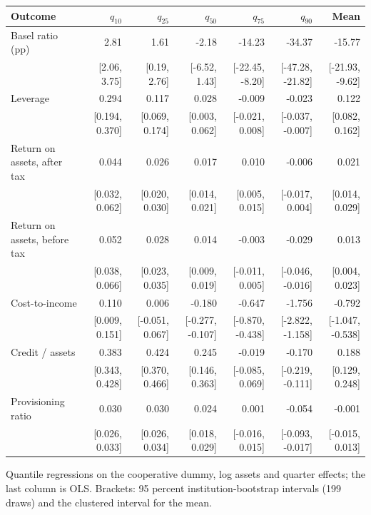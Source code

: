 \footnotesize
\setlength{\tabcolsep}{2.5pt}
\begin{tabular}{lrrrrrr}
\toprule
Outcome & $q_{10}$ & $q_{25}$ & $q_{50}$ & $q_{75}$ & $q_{90}$ & Mean \\
\midrule
Basel ratio (pp) & 2.81 & 1.61 & -2.18 & -14.23 & -34.37 & -15.77 \\
 & [2.06, 3.75] & [0.19, 2.76] & [-6.52, 1.43] & [-22.45, -8.20] & [-47.28, -21.82] & [-21.93, -9.62] \\
Leverage & 0.294 & 0.117 & 0.028 & -0.009 & -0.023 & 0.122 \\
 & [0.194, 0.370] & [0.069, 0.174] & [0.003, 0.062] & [-0.021, 0.008] & [-0.037, -0.007] & [0.082, 0.162] \\
Return on assets, after tax & 0.044 & 0.026 & 0.017 & 0.010 & -0.006 & 0.021 \\
 & [0.032, 0.062] & [0.020, 0.030] & [0.014, 0.021] & [0.005, 0.015] & [-0.017, 0.004] & [0.014, 0.029] \\
Return on assets, before tax & 0.052 & 0.028 & 0.014 & -0.003 & -0.029 & 0.013 \\
 & [0.038, 0.066] & [0.023, 0.035] & [0.009, 0.019] & [-0.011, 0.005] & [-0.046, -0.016] & [0.004, 0.023] \\
Cost-to-income & 0.110 & 0.006 & -0.180 & -0.647 & -1.756 & -0.792 \\
 & [0.009, 0.151] & [-0.051, 0.067] & [-0.277, -0.107] & [-0.870, -0.438] & [-2.822, -1.158] & [-1.047, -0.538] \\
Credit / assets & 0.383 & 0.424 & 0.245 & -0.019 & -0.170 & 0.188 \\
 & [0.343, 0.428] & [0.370, 0.466] & [0.146, 0.363] & [-0.085, 0.069] & [-0.219, -0.111] & [0.129, 0.248] \\
Provisioning ratio & 0.030 & 0.030 & 0.024 & 0.001 & -0.054 & -0.001 \\
 & [0.026, 0.033] & [0.026, 0.034] & [0.018, 0.029] & [-0.016, 0.015] & [-0.093, -0.017] & [-0.015, 0.013] \\
\bottomrule
\end{tabular}
\begin{tablenotes}[flushleft]\footnotesize
\item Quantile regressions on the cooperative dummy, log assets and quarter effects; the last column is OLS. Brackets: 95 percent institution-bootstrap intervals (199 draws) and the clustered interval for the mean.
\end{tablenotes}
